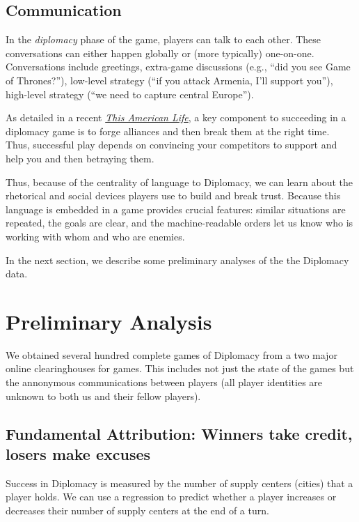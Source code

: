 \documentclass[11pt,letterpaper]{article}
\begin{document}
\subsection{Communication}

In the \emph{diplomacy} phase of the game, players can talk to each
other.  These conversations can either happen globally or (more
typically) one-on-one.  Conversations include greetings, extra-game
discussions (e.g., ``did you see Game of Thrones?''), low-level
strategy (``if you attack Armenia, I'll support you''), high-level
strategy (``we need to capture central Europe'').

As detailed in a recent
\href{http://www.thisamericanlife.org/radio-archives/episode/531/got-your-back?act=1}{\emph{This
    American Life}}, a key component to succeeding in a diplomacy game
is to forge alliances and then break them at the right time.  Thus,
successful play depends on convincing your competitors to support and
help you and then betraying them.

Thus, because of the centrality of language to Diplomacy, we can learn
about the rhetorical and social devices players use to build and break
trust.  Because this language is embedded in a game provides crucial
features: similar situations are repeated, the goals are clear, and
the machine-readable orders let us know who is working with whom and
who are enemies.

In the next section, we describe some preliminary analyses of the the
Diplomacy data.

\section{Preliminary Analysis}

We obtained several hundred complete games of Diplomacy from a two
major online clearinghouses for games.  This includes not just the
state of the games but the annonymous communications between players
(all player identities are unknown to both us and their fellow
players).

\subsection{Fundamental Attribution: Winners take credit, losers make excuses}

Success in Diplomacy is measured by the number of supply centers
(cities) that a player holds.  We can use a regression to predict
whether a player increases or decreases their number of supply centers
at the end of a turn.
\end{document}
